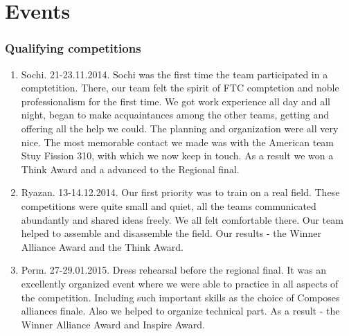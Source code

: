 \section{Events}
	\subsubsection{Qualifying competitions}
		\begin{enumerate}
			\item Sochi. 21-23.11.2014. 
			Sochi was the first time the team participated in a comptetition. There, our team felt the spirit of FTC comptetion and noble professionalism for the first time. We got work experience all day and all night, began to make acquaintances among the other teams, getting and offering all the help we could. The planning and organization were all very nice. The most memorable contact we made was with the American team Stuy Fission 310, with which we now keep in touch. As a result we won a Think Award and a advanced to the Regional final.
			\begin{figure}[H]
			\end{figure}
			\item Ryazan. 13-14.12.2014. 
			Our first priority was to train on a real field. These competitions were quite small and quiet, all the teams communicated abundantly and shared ideas freely. We all felt comfortable there. Our team helped to assemble and disassemble the field. Our results - the Winner Alliance Award and the Think Award. 
			\begin{figure}[H]
	     	\end{figure}	
			\item Perm. 27-29.01.2015. 
			Dress rehearsal before the regional final. It was an excellently organized event where we were able to practice in all aspects of the competition. Including such important skills as the choice of Composes alliances finale. Also we helped to organize technical part. As a result - the Winner Alliance Award and Inspire Award.
			\begin{figure}[H]
				\\
	     	\end{figure}
		\end{enumerate}  
